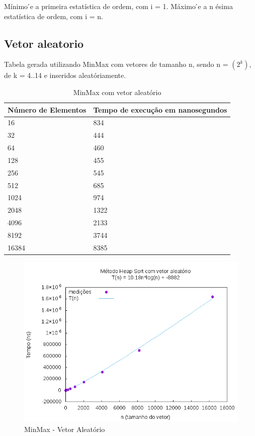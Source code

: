 \documentclass[12pt,a4paper,twoside]{report}
\begin{document}
Mínimo  ́e a primeira estatística de ordem, com i = 1.
Máximo  ́e a n ésima estatística de ordem, com i = n.

\subsection{Vetor aleatorio}
Tabela gerada utilizando MinMax com vetores de tamanho n, sendo n = $(2^k)$, de k = 4..14 e inseridos aleatóriamente.
\begin{table}[H]
\centering
\caption{MinMax com vetor aleatório}
\label{my-label}
\begin{tabular}{|l|l|}
\hline
\multicolumn{1}{|c|}{\textbf{Número de Elementos}} & \multicolumn{1}{c|}{\textbf{Tempo de execução em nanosegundos}} \\ \hline
16 & 834 \\ \hline
32 & 444 \\ \hline
64 & 460 \\ \hline
128 & 455 \\ \hline
256 & 545 \\ \hline
512 & 685 \\ \hline
1024 & 974 \\ \hline
2048 & 1322 \\ \hline
4096 & 2133 \\ \hline
8192 & 3744 \\ \hline
16384 & 8385 \\ \hline
\end{tabular}
\end{table}

\begin{figure}[H]
    \centering
    \includegraphics[width=0.7\linewidth]{graficos/HeapSort/vIntAleatorio/vIntAleatorio.png}
  \caption{MinMax - Vetor Aleatório}
\end{figure}
\end{document}
